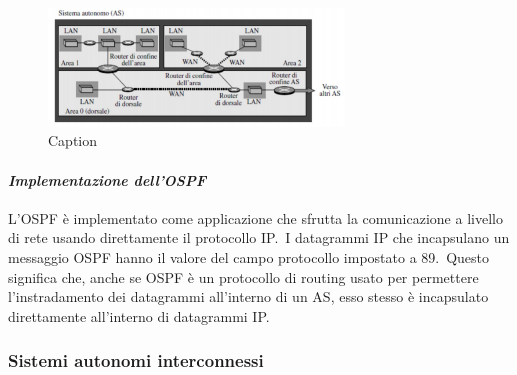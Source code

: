 \begin{figure}[H]
    \centering
    \includegraphics[width=0.7\textwidth]{immagini/AS.jpg}
    \caption{Caption}
    \label{fig:AS}
\end{figure}

\paragraph{\emph{Implementazione dell'OSPF}}

L'OSPF è implementato come applicazione che sfrutta la comunicazione a livello di rete usando direttamente il protocollo IP.\
I datagrammi IP che incapsulano un messaggio OSPF hanno il valore del campo protocollo impostato a 89.\
Questo significa che, anche se OSPF è un protocollo di routing usato per permettere l'instradamento dei datagrammi all'interno di un AS, esso stesso è incapsulato direttamente all'interno di datagrammi IP.

\subsubsection{Sistemi autonomi interconnessi}


